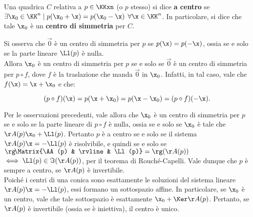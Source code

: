 \documentclass[11pt]{article}
\begin{document}
	\begin{definition} 
		Una quadrica $C$ relativa a $p \in \KKxn$ (o $p$ stesso) si dice \textbf{a centro} se
		$\exists \x_0 \in \KK^n \mid p(\x_0 + \x) = p(\x_0 - \x)$ $\forall \x \in \KK^n$. In particolare, si dice che tale $\x_0$ è un \textbf{centro di simmetria} per $C$.
	\end{definition}

	\begin{remark}\nl
		\li Si osserva che $\vec 0$ è un centro di simmetria per $p$ se
		$p(\x) = p(-\x)$, ossia se e solo se la parte lineare $\Ll(p)$ è
		nulla. \\
		
		\li Allora $\x_0$ è un centro di simmetria per $p$ se e solo se $\vec 0$
		è un centro di simmetria per $p \circ f$, dove $f$ è la traslazione
		che manda $\vec 0$ in $\x_0$. Infatti, in tal caso, vale che $f(\x) = \x + \x_0$ e che:
		
		\[ (p \circ f)(\x) = p(\x + \x_0) = p(\x - \x_0) = (p \circ f)(-\x). \]
		
		\vskip 0.05in
		
		\li Per le osservazioni precedenti, vale allora che $\x_0$ è un centro
		di simmetria per $p$ se e solo se la parte lineare di $p \circ f$
		è nulla, ossia se e solo se $\x_0$ è tale che $\AA(p) \x_0 + \Ll(p)$.
		Pertanto $p$ è a centro se e solo se il sistema $\AA(p) \x = - \Ll(p)$
		è risolvibile, e quindi se e solo se $\rg\!\Matrix{\AA(p) & \rvline & \Ll(p)} = \rg(\AA(p))$ $\iff \Ll(p) \in \Im(\AA(p))$, per il teorema di Rouché-Capelli. Vale
		dunque che $p$ è sempre a centro, se $\AA(p)$ è invertibile. \\
		
		Poiché i centri di una conica sono esattamente le soluzioni del
		sistema lineare $\AA(p) \x = - \Ll(p)$, essi formano un sottospazio
		affine. In particolare, se $\x_0$ è un centro, vale che tale sottospazio
		è esattamente $\x_0 + \Ker \AA(p)$. Pertanto, se $\AA(p)$ è invertibile
		(ossia se è iniettiva), il centro è unico.
	\end{remark}
\end{document}
